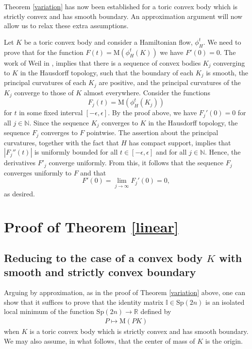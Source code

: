 \documentclass[12pt]{amsart}
\theoremstyle{definition}
\newcommand{\II}{{\mathbb I}}
\newcommand{\RR}{{\mathbb R}}
\newcommand{\NN}{{\mathbb N}}
\newcommand{\mw}{{{\mathrm {M}}}}
\begin{document}
Theorem \ref{variation} has now been established for a toric convex body which is strictly convex and has smooth boundary. An approximation argument will now allow us to relax these extra assumptions. 

Let $K$ be a toric convex body and consider a Hamiltonian flow, $\phi^t_H$. We need to prove that for the function $F(t) = \mw(\phi^t_H(K))$ we have 
$F'(0)=0$. The work of Weil in \cite{weil}, implies that there is a sequence of convex bodies $K_j$ converging to $K$ in the Hausdorff topology, such that the boundary of each $K_j$ is smooth, the principal curvatures of each $K_j$ are positive, and the principal curvatures of the $K_j$ converge to those of $K$ almost everywhere. Consider the functions $$F_j(t) = \mw(\phi^t_H (K_j))$$ for $t$ in some fixed interval $[-\epsilon, \epsilon]$. By the proof above, we have $F_j'(0)=0$ for all $j \in \NN$. Since the sequence $K_j$ converges to $K$ in the Hausdorff topology, the sequence $F_j$ converges to $F$ pointwise. The assertion about the principal  curvatures, together with the fact that $H$ has compact support, implies that $|F_j''(t)|$ is uniformly bounded for all $t\in [-\epsilon, \epsilon]$ and for all $j \in \NN$. Hence, the derivatives $F'_j$ converge uniformly. From this, it follows that the sequence $F_j$ converges uniformly to $F$ and that $$F'(0) =  \lim_{j\to \infty} F_j'(0) =0,$$as desired.


\section{Proof of Theorem \ref{linear}}\label{sec:linear}

\subsection{Reducing to the case of a convex body $K$ with smooth and strictly convex boundary} Arguing by approximation, as in the proof of Theorem \ref{variation} above, one can show that it suffices to prove that the identity matrix  $\II \in \mathrm{Sp}(2n)$ is an isolated local minimum of the function $\mathrm{Sp}(2n) \to \RR$ defined by 
\begin{align*}
 P \mapsto \mw(PK)
\end{align*}
when $K$ is a toric convex body which is strictly convex and has smooth boundary. We may also assume, in what follows, that the center of mass of $K$ is the origin.
\end{document}
